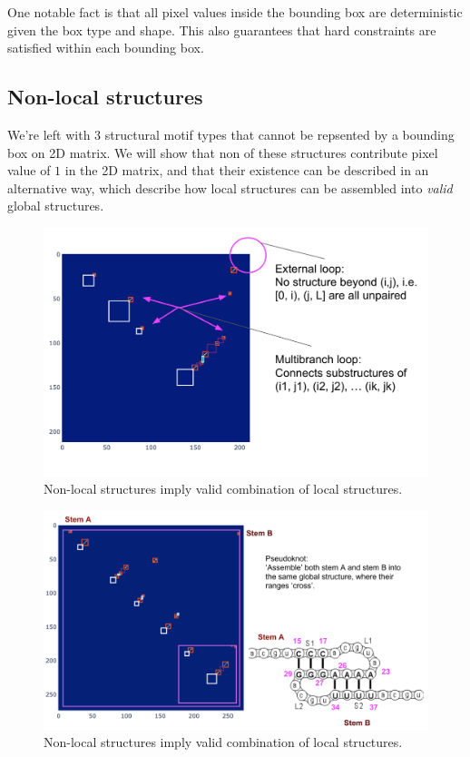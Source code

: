 \documentclass[12pt]{article}
\begin{document}
One notable fact is that all pixel values inside the bounding box are deterministic given the box type and shape.
This also guarantees that hard constraints are satisfied within each bounding box.

\subsection{Non-local structures}

We're left with $3$ structural motif types that cannot be repsented by a bounding box on 2D matrix.
We will show that non of these structures contribute pixel value of $1$ in the 2D matrix,
and that their existence can be described in an alternative way,
which describe how local structures can be assembled into \textit{valid} global structures.

\begin{figure}[h]
    \centering
    \includegraphics[width=\textwidth]{plot/non_local_structures_2d_matrix.png}
    \caption{Non-local structures imply valid combination of local structures.}
    \label{fig:non_local_structures_2d_matrix}
    \centering
\end{figure}


\begin{figure}[h]
    \centering
    \includegraphics[width=\textwidth]{plot/non_local_structures_pseudoknot.png}
    \caption{Non-local structures imply valid combination of local structures.}
    \label{fig:non_local_structures_pseudoknot}
    \centering
\end{figure}
\end{document}
